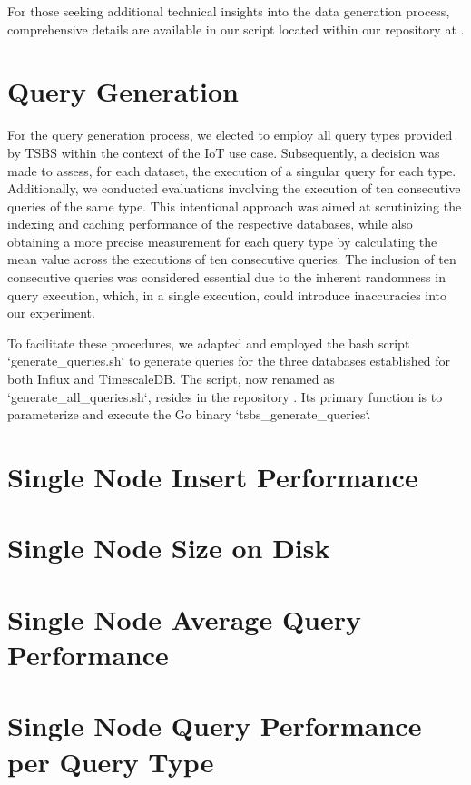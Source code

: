 \documentclass[conference]{IEEEtran}
\begin{document}
For those seeking additional technical insights into the data generation process, comprehensive details are available in our script located within our repository at \cite{b2}.


\section{Query Generation}
For the query generation process, we elected to employ all query types provided by TSBS within the context of the IoT use case. Subsequently, a decision was made to assess, for each dataset, the execution of a singular query for each type. Additionally, we conducted evaluations involving the execution of ten consecutive queries of the same type.  This intentional approach was aimed at scrutinizing the indexing and caching performance of the respective databases, while also obtaining a more precise measurement for each query type by calculating the mean value across the executions of ten consecutive queries. The inclusion of ten consecutive queries was considered essential due to the inherent randomness in query execution, which, in a single execution, could introduce inaccuracies into our experiment.

To facilitate these procedures, we adapted and employed the bash script `generate\_queries.sh` to generate queries for the three databases established for both Influx and TimescaleDB. The script, now renamed as `generate\_all\_queries.sh`, resides in the repository \cite{b2}. Its primary function is to parameterize and execute the Go binary `tsbs\_generate\_queries`.

\section{Single Node Insert Performance}

\section{Single Node Size on Disk}

\section{Single Node Average Query Performance}

\section{Single Node Query Performance per Query Type}
\end{document}
